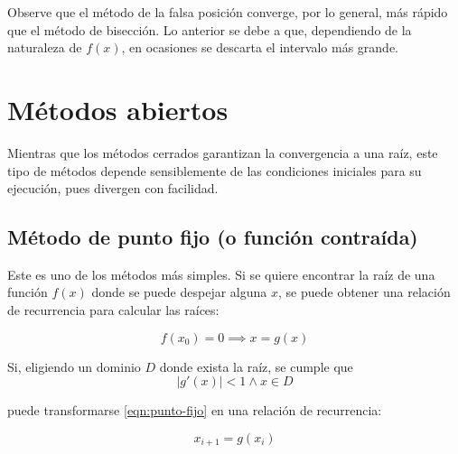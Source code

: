 Observe que el método de la falsa posición converge, por lo general, más rápido
que el método de bisección. Lo anterior se debe a que, dependiendo de la
naturaleza de $f(x)$, en ocasiones se descarta el intervalo más grande.


\section{Métodos abiertos}

Mientras que los métodos cerrados garantizan la convergencia a una raíz, este
tipo de métodos depende sensiblemente de las condiciones iniciales para su
ejecución, pues divergen con facilidad.

\subsection{Método de punto fijo (o función contraída)}

Este es uno de los métodos más simples. Si se quiere encontrar la raíz de una
función $f(x)$ donde se puede despejar alguna $x$, se puede obtener una
relación de recurrencia para calcular las raíces:

\begin{equation}\label{eqn:punto-fijo}
    f(x_0) = 0 \implies \boxed{x = g(x)}
\end{equation}

Si, eligiendo un dominio $D$ donde exista la raíz, se cumple que
\[
    \left| g'(x) \right| < 1 \land x \in D
\]

\noindent puede transformarse \ref{eqn:punto-fijo} en una relación de
recurrencia:

\begin{equation} \label{eqn:recurrencia-punto-fijo}
    \boxed{x_{i+1} = g(x_i)}
\end{equation}

